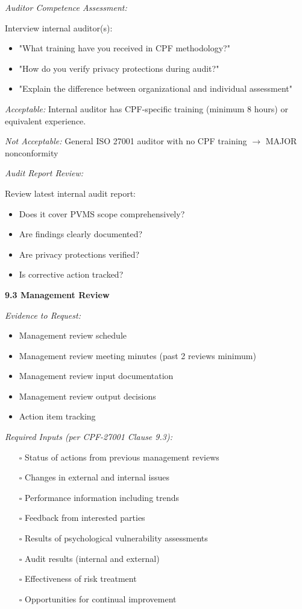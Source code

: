 \documentclass[11pt,a4paper]{article}
\begin{document}
\textit{Auditor Competence Assessment:}

Interview internal auditor(s):
\begin{itemize}
\item "What training have you received in CPF methodology?"
\item "How do you verify privacy protections during audit?"
\item "Explain the difference between organizational and individual assessment"
\end{itemize}

\textit{Acceptable:} Internal auditor has CPF-specific training (minimum 8 hours) or equivalent experience.

\textit{Not Acceptable:} General ISO 27001 auditor with no CPF training $\rightarrow$ MAJOR nonconformity

\textit{Audit Report Review:}

Review latest internal audit report:
\begin{itemize}
\item Does it cover PVMS scope comprehensively?
\item Are findings clearly documented?
\item Are privacy protections verified?
\item Is corrective action tracked?
\end{itemize}

\textbf{9.3 Management Review}

\textit{Evidence to Request:}
\begin{itemize}
\item Management review schedule
\item Management review meeting minutes (past 2 reviews minimum)
\item Management review input documentation
\item Management review output decisions
\item Action item tracking
\end{itemize}

\textit{Required Inputs (per CPF-27001 Clause 9.3):}

\begin{itemize}
\item[$\square$] Status of actions from previous management reviews
\item[$\square$] Changes in external and internal issues
\item[$\square$] Performance information including trends
\item[$\square$] Feedback from interested parties
\item[$\square$] Results of psychological vulnerability assessments
\item[$\square$] Audit results (internal and external)
\item[$\square$] Effectiveness of risk treatment
\item[$\square$] Opportunities for continual improvement
\end{itemize}
\end{document}

